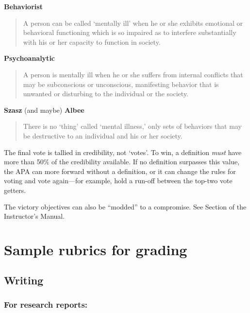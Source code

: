 \begin{refsection}
\textbf{Behaviorist}

\begin{quote}

A person can be called `mentally ill' when he or she exhibits emotional or behavioral functioning which is so impaired as to interfere substantially with his or her capacity to function in society. 
\end{quote}

\textbf{Psychoanalytic} 

\begin{quote}

A person is mentally ill when he or she suffers from internal conflicts that may be subconscious or unconscious, manifesting behavior that is unwanted or disturbing to the individual or the society.
\end{quote}

\textbf{Szasz} (and maybe) \textbf{Albee}

\begin{quote}

There is no `thing' called `mental illness,' only sets of behaviors that may be destructive to an individual and his or her society.
\end{quote}

The final vote is tallied in credibility, not `votes'. To win, a definition \emph{must} have more than 50\% of the credibility available. If no definition surpasses this value, the APA can more forward without a definition, or it can change the rules for voting and vote again---for example, hold a run-off between the top-two vote getters. 

The victory objectives can also be ``modded'' to a compromise. See Section  of the Instructor's Manual.

\section{Sample rubrics for grading}
\label{samplerubricsforgrading}

\subsection{Writing}
\label{writing}

\subsubsection{For research reports:}
\label{forresearchreports:}


\end{refsection}
